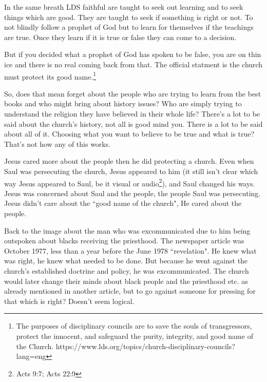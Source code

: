 In the same breath LDS faithful are taught to seek out learning and to seek things
which are good. They are taught to seek if something is right or not. To not blindly
follow a prophet of God but to learn for themselves if the teachings are true. Once
they learn if it is true or false they can come to a decision.

But if you decided what a prophet of God has spoken to be false, you are on thin ice
and there is no real coming back from that. The official statment is the church must
protect its good name.\footnote{
The purposes of disciplinary councils are to save the souls of transgressors, 
protect the innocent, and safeguard the purity, integrity, 
and good name of the Church.
https://www.lds.org/topics/church-disciplinary-councils?lang=eng
}

So, does that mean forget about the people who are trying to learn from the best
books and who might bring about history issues? Who are simply trying to understand
the religion they have believed in their whole life? There's a lot to be said about
the church's history, not all is good mind you. There is a lot to be said about all
of it. Choosing what you want to believe to be true and what is true? That's not how
any of this works.

Jesus cared more about the people then he did protecting a church. Even when Saul was
persecuting the church, Jesus appeared to him (it still isn't clear which way Jesus
appeared to Saul, be it visual or audio\footnote{Acts 9:7; Acts 22:9}), 
and Saul changed his ways. Jesus was concerned about Saul and the people, the people 
Saul was persecuting. Jesus didn't care about the ``good name of the church", He 
cared about the people.

Back to the image about the man who was excommunicated due to him being outspoken
about blacks receiving the priesthood. The newspaper article was October 1977, less
than a year before the June 1978 ``revelation". He knew what was right, he knew what
needed to be done. But because he went against the church's established doctrine and
policy, he was excommunicated. The church would later change their minds about black
people and the priesthood etc. as already mentioned in another article, but to go
against someone for pressing for that which is right? Doesn't seem logical.
